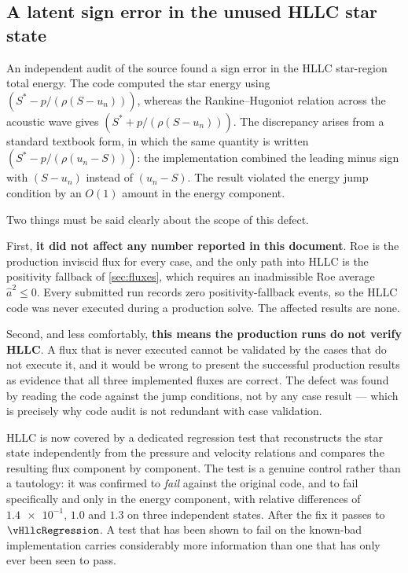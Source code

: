 \subsection{A latent sign error in the unused HLLC star state}
\label{sec:hllcbug}

An independent audit of the source found a sign error in the HLLC star-region
total energy. The code computed the star energy using
$\left(S^\ast-p/(\rho(S-u_n))\right)$, whereas the Rankine--Hugoniot relation
across the acoustic wave gives $\left(S^\ast+p/(\rho(S-u_n))\right)$. The
discrepancy arises from a standard textbook form, in which the same quantity is
written $\left(S^\ast-p/(\rho(u_n-S))\right)$: the implementation combined the
leading minus sign with $(S-u_n)$ instead of $(u_n-S)$. The result violated the
energy jump condition by an $O(1)$ amount in the energy component.

Two things must be said clearly about the scope of this defect.

First, \textbf{it did not affect any number reported in this document}. Roe is the
production inviscid flux for every case, and the only path into HLLC is the
positivity fallback of \cref{sec:fluxes}, which requires an inadmissible Roe
average $\hat{a}^2\le0$. Every submitted run records zero positivity-fallback
events, so the HLLC code was never executed during a production solve. The
affected results are none.

Second, and less comfortably, \textbf{this means the production runs do not
verify HLLC}. A flux that is never executed cannot be validated by the cases that
do not execute it, and it would be wrong to present the successful production
results as evidence that all three implemented fluxes are correct. The defect was
found by reading the code against the jump conditions, not by any case result ---
which is precisely why code audit is not redundant with case validation.

HLLC is now covered by a dedicated regression test that reconstructs the star
state independently from the pressure and velocity relations and compares the
resulting flux component by component. The test is a genuine control rather than a
tautology: it was confirmed to \emph{fail} against the original code, and to fail
specifically and only in the energy component, with relative differences of
$\num{1.4e-1}$, $\num{1.0}$ and $\num{1.3}$ on three independent states. After the
fix it passes to $\vHllcRegression$. A test that has been shown to fail on the
known-bad implementation carries considerably more information than one that has
only ever been seen to pass.

